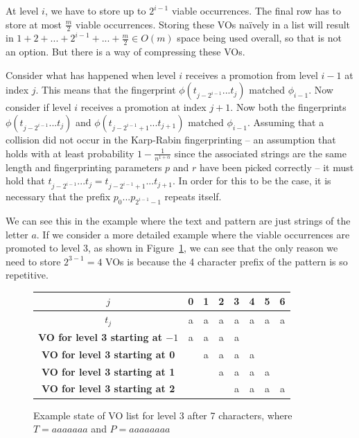 \documentclass[ %
                    author={Dominic Joseph Moylett},
                    degree={MEng},
                     title={Dictionary Matching with Fingerprints},
                  subtitle={An Empirical Analysis},
                      type={research},
                      year={2015} ]{dissertation}
\begin{document}
At level $i$, we have to store up to $2^{i - 1}$ viable occurrences. The final row has to store at most $\frac{m}{2}$ viable occurrences. Storing these VOs na\"{i}vely in a list will result in $1 + 2 + ... + 2^{i - 1} + ... + \frac{m}{2} \in O(m)$ space being used overall, so that is not an option. But there is a way of compressing these VOs.

Consider what has happened when level $i$ receives a promotion from level $i-1$ at index $j$. This means that the fingerprint $\phi(t_{j - 2^{i-1}}...t_j)$ matched $\phi_{i-1}$. Now consider if level $i$ receives a promotion at index $j+1$. Now both the fingerprints $\phi(t_{j - 2^{i-1}}...t_j)$ and $\phi(t_{j - 2^{i-1} + 1}...t_{j + 1})$ matched $\phi_{i-1}$. Assuming that a collision did not occur in the Karp-Rabin fingerprinting  --  an assumption that holds with at least probability $1 - \frac{1}{n^{1 + \alpha}}$ since the associated strings are the same length and fingerprinting parameters $p$ and $r$ have been picked correctly  --  it must hold that $t_{j - 2^{i-1}}...t_j = t_{j - 2^{i-1} + 1}...t_{j + 1}$. In order for this to be the case, it is necessary that the prefix $p_0...p_{2^{i-1} - 1}$ repeats itself.

We can see this in the example where the text and pattern are just strings of the letter $a$. If we consider a more detailed example where the viable occurrences are promoted to level 3, as shown in Figure~\ref{fig:pp-level-3}, we can see that the only reason we need to store $2^{3-1} = 4$ VOs is because the 4 character prefix of the pattern is so repetitive.

\begin{figure}[t]
\centering
\begin{tabular}{|c|c c c c c c c|}
  \hline
  $j$ & 0 & 1 & 2 & 3 & 4 & 5 & 6 \\
  \hline
  $t_j$ & a & a & a & a & a & a & a \\
  \hline
  \textbf{VO for level 3 starting at $-1$} & a & a & a & a &  &  &  \\
  \hline
  \textbf{VO for level 3 starting at 0} &  & a & a & a & a &  &  \\
  \hline
  \textbf{VO for level 3 starting at 1} &  &  & a & a & a & a &  \\
  \hline
  \textbf{VO for level 3 starting at 2} &  &  &  & a & a & a & a \\
  \hline
\end{tabular}
\caption{Example state of VO list for level 3 after 7 characters, where $T = aaaaaaa$ and $P = aaaaaaaa$}
\label{fig:pp-level-3}
\end{figure}
\end{document}
